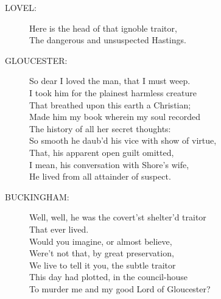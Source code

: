 \documentclass{article}
\begin{document}
\begin{description}
\item[LOVEL:] 
\hspace{1pt}Here is the head of that ignoble traitor,\\
\hspace{1pt}The dangerous and unsuspected Hastings.\\
\end{description}
\begin{description}
\item[GLOUCESTER:] 
\hspace{1pt}So dear I loved the man, that I must weep.\\
\hspace{1pt}I took him for the plainest harmless creature\\
\hspace{1pt}That breathed upon this earth a Christian;\\
\hspace{1pt}Made him my book wherein my soul recorded\\
\hspace{1pt}The history of all her secret thoughts:\\
\hspace{1pt}So smooth he daub'd his vice with show of virtue,\\
\hspace{1pt}That, his apparent open guilt omitted,\\
\hspace{1pt}I mean, his conversation with Shore's wife,\\
\hspace{1pt}He lived from all attainder of suspect.\\
\end{description}
\begin{description}
\item[BUCKINGHAM:] 
\hspace{1pt}Well, well, he was the covert'st shelter'd traitor\\
\hspace{1pt}That ever lived.\\
\hspace{1pt}Would you imagine, or almost believe,\\
\hspace{1pt}Were't not that, by great preservation,\\
\hspace{1pt}We live to tell it you, the subtle traitor\\
\hspace{1pt}This day had plotted, in the council-house\\
\hspace{1pt}To murder me and my good Lord of Gloucester?\\
\end{description}
\end{document}
